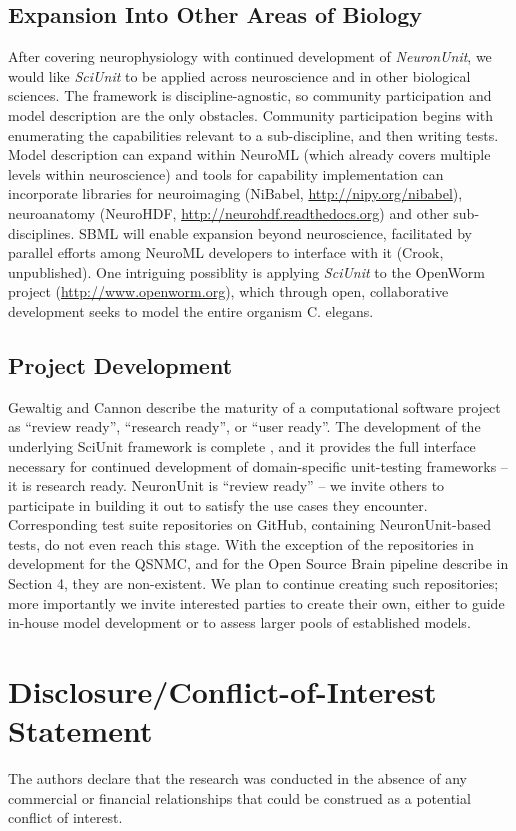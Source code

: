 \documentclass{frontiersSCNS}
\begin{document}
\subsection{Expansion Into Other Areas of Biology}
After covering neurophysiology with continued development of \textit{NeuronUnit}, we would like \textit{SciUnit} to be applied across neuroscience and in other biological sciences. 
The framework is discipline-agnostic, so community participation and model description are the only obstacles. 
Community participation begins with enumerating the capabilities relevant to a sub-discipline, and then writing tests. 
Model description can expand within NeuroML (which already covers multiple levels within neuroscience) and tools for capability implementation can incorporate libraries for neuroimaging (NiBabel, \url{http://nipy.org/nibabel}), neuroanatomy (NeuroHDF, \url{http://neurohdf.readthedocs.org}) and other sub-disciplines. 
SBML will enable expansion beyond neuroscience, facilitated by parallel efforts among NeuroML developers to interface with it (Crook, unpublished). 
One intriguing possiblity is applying \textit{SciUnit} to the OpenWorm project (\url{http://www.openworm.org}), which through open, collaborative development seeks to model the entire organism C. elegans.  

\subsection{Project Development}
Gewaltig and Cannon describe the maturity of a computational software project \citep{gewaltig_current_2014} as ``review ready'', ``research ready'', or ``user ready''.  
The development of the underlying SciUnit framework is complete \citep{omar_sciunit_2014}, and it provides the full interface necessary for continued development of domain-specific unit-testing frameworks -- it is research ready.  NeuronUnit is ``review ready'' -- we invite others to participate in building it out to satisfy the use cases they encounter.  Corresponding test suite repositories on GitHub, containing NeuronUnit-based tests, do not even reach this stage.  With the exception of the repositories in development for the QSNMC, and for the Open Source Brain pipeline describe in Section 4, they are non-existent.  We plan to continue creating such repositories; more importantly we invite interested parties to create their own, either to guide in-house model development or to assess larger pools of established models.  

\section*{Disclosure/Conflict-of-Interest Statement}
The authors declare that the research was conducted in the absence of any commercial or financial relationships that could be construed as a potential conflict of interest.
\end{document}
